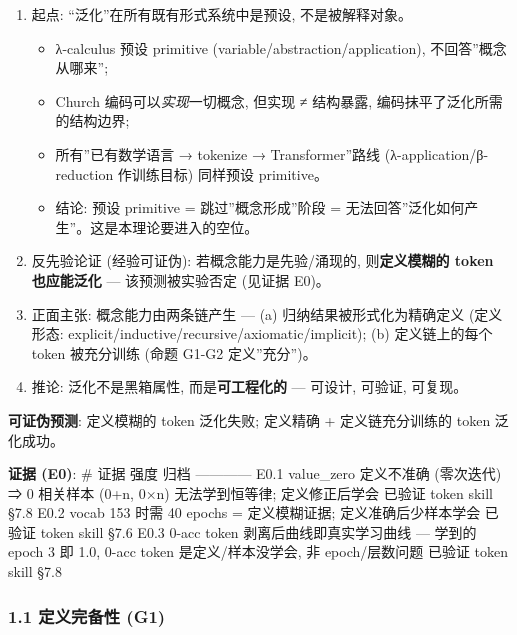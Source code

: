 \documentclass[
]{article}
\providecommand{\tightlist}{%
  \setlength{\itemsep}{0pt}\setlength{\parskip}{0pt}}
\begin{document}
\begin{enumerate}
\def\labelenumi{\arabic{enumi}.}
\tightlist
\item
  起点: ``泛化''在所有既有形式系统中是预设, 不是被解释对象。

  \begin{itemize}
  \tightlist
  \item
    λ-calculus 预设 primitive (variable/abstraction/application),
    不回答''概念从哪来'';
  \item
    Church 编码可以\emph{实现}一切概念, 但实现 ≠ 结构暴露,
    编码抹平了泛化所需的结构边界;
  \item
    所有''已有数学语言 → tokenize → Transformer''路线
    (λ-application/β-reduction 作训练目标) 同样预设 primitive。
  \item
    结论: 预设 primitive = 跳过''概念形成''阶段 =
    无法回答''泛化如何产生''。这是本理论要进入的空位。
  \end{itemize}
\item
  反先验论证 (经验可证伪): 若概念能力是先验/涌现的, 则\textbf{定义模糊的
  token 也应能泛化} --- 该预测被实验否定 (见证据 E0)。
\item
  正面主张: 概念能力由两条链产生 --- (a) 归纳结果被形式化为精确定义
  (定义形态: explicit/inductive/recursive/axiomatic/implicit); (b)
  定义链上的每个 token 被充分训练 (命题 G1-G2 定义''充分'')。
\item
  推论: 泛化不是黑箱属性, 而是\textbf{可工程化的} --- 可设计, 可验证,
  可复现。
\end{enumerate}

\textbf{可证伪预测}: 定义模糊的 token 泛化失败; 定义精确 +
定义链充分训练的 token 泛化成功。

\textbf{证据 (E0)}: \textbar{} \# \textbar{} 证据 \textbar{} 强度
\textbar{} 归档 \textbar{}
\textbar---\textbar---\textbar---\textbar---\textbar{} \textbar{} E0.1
\textbar{} value\_zero 定义不准确 (零次迭代) ⇒ 0 相关样本 (0+n, 0×n)
无法学到恒等律; 定义修正后学会 \textbar{} 已验证 \textbar{} token skill
§7.8 \textbar{} \textbar{} E0.2 \textbar{} vocab 153 时需 40 epochs =
定义模糊证据; 定义准确后少样本学会 \textbar{} 已验证 \textbar{} token
skill §7.6 \textbar{} \textbar{} E0.3 \textbar{} 0-acc token
剥离后曲线即真实学习曲线 --- 学到的 epoch 3 即 1.0, 0-acc token
是定义/样本没学会, 非 epoch/层数问题 \textbar{} 已验证 \textbar{} token
skill §7.8 \textbar{}

\subsubsection{1.1 定义完备性
(G1)}\label{ux5b9aux4e49ux5b8cux5907ux6027-g1}
\end{document}
